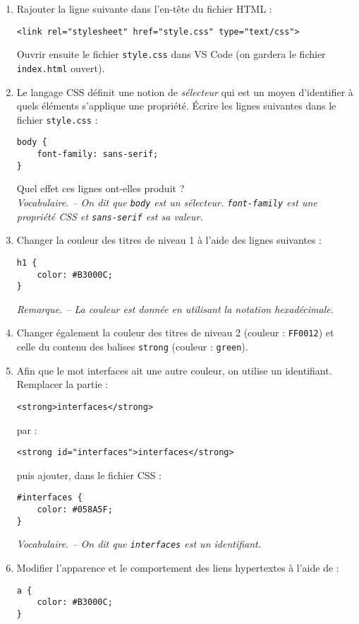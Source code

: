 \documentclass[a4paper,dvipsnames]{article}
\begin{document}
\begin{activite}[breakable]{}{}
  \begin{enumerate}
    \item Rajouter la ligne suivante dans l'en-tête du fichier HTML :
      \begin{verbatim}
<link rel="stylesheet" href="style.css" type="text/css">
      \end{verbatim}
      Ouvrir ensuite le fichier \verb|style.css| dans VS Code (on gardera le fichier \verb|index.html| ouvert).
    \item Le langage CSS définit une notion de \textit{sélecteur} qui est un moyen d'identifier à quels éléments s'applique une propriété. Écrire les lignes suivantes dans le fichier \verb|style.css| :
      \begin{verbatim}
body {
    font-family: sans-serif;
}
      \end{verbatim}
      Quel effet ces lignes ont-elles produit ?\\
      \textit{Vocabulaire. -- On dit que \texttt{body} est un sélecteur. \texttt{font-family} est une propriété CSS et \texttt{sans-serif} est sa valeur.}
    \item Changer la couleur des titres de niveau 1 à l'aide des lignes suivantes :
      \begin{verbatim}
h1 {
    color: #B3000C;
}
      \end{verbatim}
      \textit{Remarque. -- La couleur est donnée en utilisant la notation hexadécimale.}
    \item Changer également la couleur des titres de niveau 2 (couleur : \texttt{FF0012}) et celle du contenu des balises \texttt{strong} (couleur : \texttt{green}).
    \item Afin que le mot \og{}interfaces\fg{} ait une autre couleur, on utilise un identifiant. Remplacer la partie :

      \begin{verbatim}
<strong>interfaces</strong>
      \end{verbatim}

      par : 

      \begin{verbatim}
<strong id="interfaces">interfaces</strong>
      \end{verbatim}

      puis ajouter, dans le fichier CSS :
      \begin{verbatim}
#interfaces {
    color: #058A5F;
}
      \end{verbatim}
      \textit{Vocabulaire. -- On dit que \texttt{interfaces} est un identifiant.}
    \item Modifier l'apparence et le comportement des liens hypertextes à l'aide de :
      \begin{verbatim}
a {
    color: #B3000C;
}
      \end{verbatim}


\end{enumerate}
\end{activite}
\end{document}
